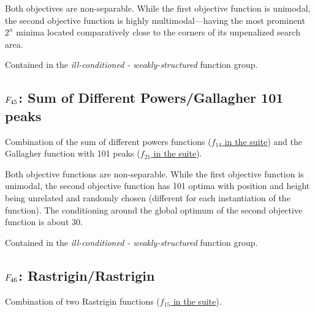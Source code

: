 Both objectives are non-separable.
While the first objective function is unimodal,
the second objective function is highly multimodal---having the most
prominent \(2^n\) minima located comparatively close to the corners
of its unpenalized search area.

Contained in the \emph{ill-conditioned - weakly-structured} function group.



\subsection[\texorpdfstring{\protect\(F_{45}\protect\): Sum of Different Powers/Gallagher 101 peaks}{F45: Sum of Different Powers/Gallagher 101 peaks}]{\texorpdfstring{\protect\(F_{45}\protect\): Sum of Different Powers/Gallagher 101 peaks}{}}
\label{index:sum-of-different-powers-gallagher-101-peaks}\label{index:f45}
Combination of the sum of different powers functions
(\href{https://coco.gforge.inria.fr/downloads/download16.00/bbobdocfunctions.pdf\#page=70}{\(f_{14}\) in the \bbob suite}) and the Gallagher function with
101 peaks (\href{https://coco.gforge.inria.fr/downloads/download16.00/bbobdocfunctions.pdf\#page=105}{\(f_{21}\) in the \bbob suite}).

Both objective functions are non-separable.
While the first objective function is unimodal, the second objective function
has 101 optima with position and height being unrelated and randomly
chosen (different for each instantiation of the function). The
conditioning around the global optimum of the second objective function
is about 30.

Contained in the \emph{ill-conditioned - weakly-structured} function group.



\subsection[\texorpdfstring{\protect\(F_{46}\protect\): Rastrigin/Rastrigin}{F46: Rastrigin/Rastrigin}]{\texorpdfstring{\protect\(F_{46}\protect\): Rastrigin/Rastrigin}{}}
\label{index:rastrigin-rastrigin}\label{index:f46}
Combination of two Rastrigin functions
(\href{https://coco.gforge.inria.fr/downloads/download16.00/bbobdocfunctions.pdf\#page=75}{\(f_{15}\) in the \bbob suite}).

